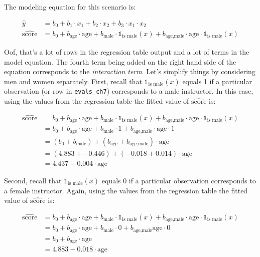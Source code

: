 \documentclass[12pt, krantz2,]{krantz}
\begin{document}
The modeling equation for this scenario is:

\begin{align}
\widehat{y} &= b_0 + b_1 \cdot x_1 + b_2 \cdot x_2 + b_3 \cdot x_1 \cdot x_2\\
\widehat{\mbox{score}} &= b_0 + b_{\mbox{age}} \cdot \mbox{age} + b_{\mbox{male}} \cdot \mathbb{1}_{\mbox{is male}}(x) + b_{\mbox{age,male}} \cdot \mbox{age} \cdot \mathbb{1}_{\mbox{is male}}(x)
\end{align}

Oof, that's a lot of rows in the regression table output and a lot of terms in the model equation. The fourth term being added on the right hand side of the equation corresponds to the \emph{interaction term}. Let's simplify things by considering men and women separately. First, recall that \(\mathbb{1}_{\mbox{is male}}(x)\) equals 1 if a particular observation (or row in \texttt{evals\_ch7}) corresponds to a male instructor. In this case, using the values from the regression table the fitted value of \(\widehat{\mbox{score}}\) is:

\begin{align}
\widehat{\mbox{score}} &= b_0 + b_{\mbox{age}} \cdot \mbox{age} + b_{\mbox{male}} \cdot \mathbb{1}_{\mbox{is male}}(x) + b_{\mbox{age,male}} \cdot \mbox{age} \cdot \mathbb{1}_{\mbox{is male}}(x) \\
&= b_0 + b_{\mbox{age}} \cdot \mbox{age} + b_{\mbox{male}} \cdot 1 + b_{\mbox{age,male}} \cdot \mbox{age} \cdot 1 \\
&= \left(b_0 + b_{\mbox{male}}\right) + \left(b_{\mbox{age}} +  b_{\mbox{age,male}} \right) \cdot \mbox{age} \\
&= \left(4.883 + -0.446\right) + \left(-0.018 +  0.014 \right) \cdot \mbox{age} \\
&= 4.437 -0.004 \cdot \mbox{age}
\end{align}

Second, recall that \(\mathbb{1}_{\mbox{is male}}(x)\) equals 0 if a particular observation corresponds to a female instructor. Again, using the values from the regression table the fitted value of \(\widehat{\mbox{score}}\) is:

\begin{align}
\widehat{\mbox{score}} &= b_0 + b_{\mbox{age}} \cdot \mbox{age} + b_{\mbox{male}} \cdot \mathbb{1}_{\mbox{is male}}(x) + b_{\mbox{age,male}} \cdot \mbox{age} \cdot \mathbb{1}_{\mbox{is male}}(x) \\
&= b_0 + b_{\mbox{age}} \cdot \mbox{age} + b_{\mbox{male}} \cdot 0 + b_{\mbox{age,male}}\mbox{age} \cdot 0 \\
&= b_0 + b_{\mbox{age}} \cdot \mbox{age}\\
&= 4.883 -0.018 \cdot \mbox{age}
\end{align}
\end{document}
